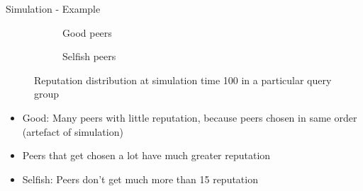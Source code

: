 \documentclass[presentation,english,usenames,dvipsnames]{beamer}
\begin{document}
\begin{frame}{Simulation - Example}
  \begin{figure}
    \centering
    \begin{subfigure}{.5\textwidth}
      \caption*{Good peers}
    \end{subfigure}%
    \begin{subfigure}{.5\textwidth}
      \caption*{Selfish peers}
    \end{subfigure}
    \caption*{Reputation distribution at simulation time 100 in a particular
              query group}
  \end{figure}
  \begin{itemize}
    \item Good: Many peers with little reputation, because peers chosen in same
          order (artefact of simulation)
    \item Peers that get chosen a lot have much greater reputation
    \item Selfish: Peers don't get much more than 15 reputation
  \end{itemize}
\end{frame}
\end{document}
